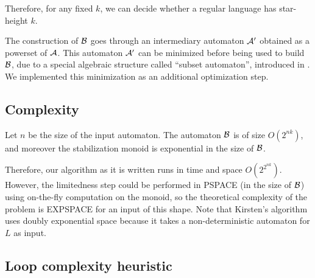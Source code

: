Therefore, for any fixed $k$, we can decide whether a regular language has star-height $k$.

The construction of $\mathcal B$ goes through an intermediary automaton $\mathcal{A}'$ obtained as a powerset of $\mathcal{A}$. This automaton $\mathcal{A}'$ can be minimized before being used to build $\mathcal B$, due to a special algebraic structure called ``subset automaton'', introduced in \cite{CL08sh}.
We implemented this minimization as an additional optimization step.
%




\subsection{Complexity}

Let $n$ be the size of the input automaton.
The automaton $\mathcal B$ is of size $O(2^{nk})$, and moreover the stabilization monoid is exponential in the size of $\mathcal B$.

Therefore, our algorithm as it is written runs in time and space $O(2^{2^{nk}})$. However, the limitedness step could be performed in PSPACE (in the size of $\mathcal B$) using on-the-fly computation on the monoid, 
so the theoretical complexity of the problem is EXPSPACE for an input of this shape. 
Note that Kirsten's algorithm uses doubly exponential space because it takes a non-deterministic automaton for $L$ as input.

\subsection{Loop complexity heuristic}
\label{subsec:loop complexity}
\newcommand{\lc}{\mathrm{LC}}


